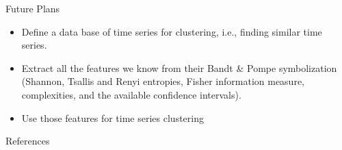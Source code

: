 \documentclass{beamer}
\begin{document}
\begin{frame}{Future Plans}
    \begin{itemize}
        \item Define a data base of time series for clustering, i.e., finding similar time series.
        \item Extract all the features we know from their Bandt \& Pompe symbolization (Shannon, Tsallis and Renyi entropies, Fisher information measure, complexities, and the available confidence intervals).
        \item Use those features for time series clustering
    \end{itemize}
\end{frame}

\begin{frame}[allowframebreaks]{References}
    
    
    
\end{frame}
\end{document}
